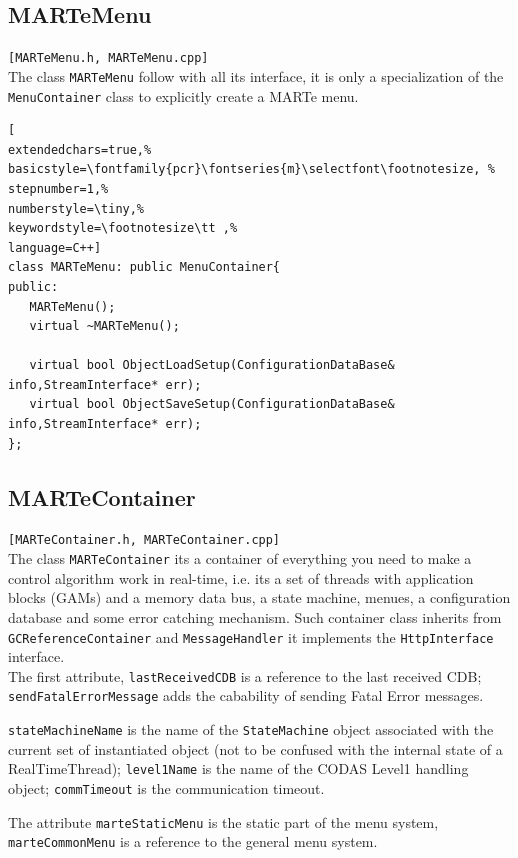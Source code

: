 \subsection{MARTeMenu}
\texttt{[MARTeMenu.h, MARTeMenu.cpp]} \\
The class \texttt{MARTeMenu} follow with all its interface, it is only a specialization of the \texttt{MenuContainer} class to explicitly create a MARTe menu.

\begin{lstlisting}[
extendedchars=true,%
basicstyle=\fontfamily{pcr}\fontseries{m}\selectfont\footnotesize, %
stepnumber=1,%
numberstyle=\tiny,%
keywordstyle=\footnotesize\tt ,%
language=C++]
class MARTeMenu: public MenuContainer{
public:
   MARTeMenu();
   virtual ~MARTeMenu();

   virtual bool ObjectLoadSetup(ConfigurationDataBase& info,StreamInterface* err);
   virtual bool ObjectSaveSetup(ConfigurationDataBase& info,StreamInterface* err);
};
\end{lstlisting}



\subsection{MARTeContainer}
\texttt{[MARTeContainer.h, MARTeContainer.cpp]} \\
The class \texttt{MARTeContainer} its a container of everything you need to make a control algorithm work in real-time, i.e. its a set of threads with application blocks (GAMs) and a memory data bus, a state machine, menues, a configuration database and some error catching mechanism. Such container class inherits from \texttt{GCReferenceContainer} and \texttt{MessageHandler} it implements the \texttt{HttpInterface} interface. \\


The first attribute, \texttt{lastReceivedCDB} is a reference to the last received CDB; \texttt{sendFatalErrorMessage} adds the cabability of sending Fatal Error messages.

\texttt{stateMachineName} is the name of the \texttt{StateMachine} object associated with the current set of instantiated object (not to be confused with the internal state of a RealTimeThread); \texttt{level1Name} is the name of the CODAS Level1 handling object; \texttt{commTimeout} is the communication timeout.

The attribute \texttt{marteStaticMenu} is the static part of the menu system, \texttt{marteCommonMenu} is a reference to the general menu system. \\


